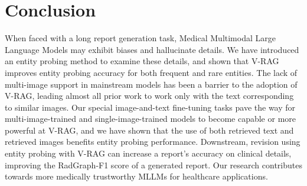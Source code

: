 \section{Conclusion}

When faced with a long report generation task, Medical Multimodal Large Language Models may exhibit biases and hallucinate details. We have introduced an entity probing method to examine these details, and shown that V-RAG improves entity probing accuracy for both frequent and rare entities. The lack of multi-image support in mainstream models has been a barrier to the adoption of V-RAG, leading almost all prior work to work only with the text corresponding to similar images.  Our special image-and-text fine-tuning tasks pave the way for multi-image-trained and single-image-trained models to become capable or more powerful at V-RAG, and we have shown that the use of both retrieved text and retrieved images benefits entity probing performance. Downstream, revision using entity probing with V-RAG can increase a report's accuracy on clinical details, improving the RadGraph-F1 score of a generated report.  Our research contributes towards more medically trustworthy MLLMs for healthcare applications.

